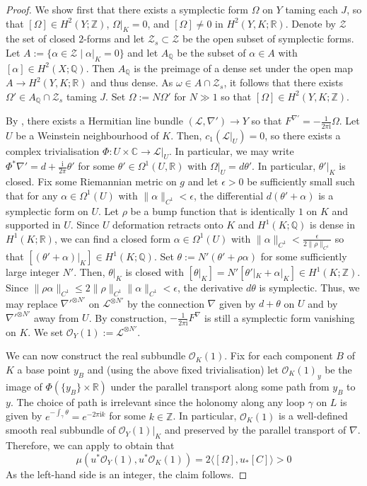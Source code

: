 \documentclass[11pt,psamsfonts, oneside, reqno]{amsart}
\newcommand{\sub}{\subset}%
\newcommand{\norm}[1]{\lVert#1\rVert}
\newcommand{\cl}{\colon}
\newcommand{\conn}{\nabla}
\newcommand{\lspan}[1]{\langle {#1}\rangle}
\newcommand{\bC}{\mathbb{C}}
\newcommand{\bQ}{\mathbb{Q}}
\newcommand{\bR}{\mathbb{R}}
\newcommand{\bZ}{\mathbb{Z}}
\newcommand{\cL}{\mathcal{L}}
\newcommand{\cO}{\mathcal{O}}
\newcommand{\cZ}{\mathcal{Z}}
\theoremstyle{definition}
\theoremstyle{remark}
\numberwithin{equation}{section}
\begin{document}
\begin{proof} We show first that there exists a symplectic form $\Omega$ on $Y$ taming each $J$, so that $[\Omega]\in H^2(Y;\bZ)$, $\Omega|_K = 0$, and $[\Omega]\neq 0$ in $H^2(Y,K;\bR)$. Denote by $\cZ$ the set of closed $2$-forms and let $\cZ_s \sub \cZ$ be the open subset of symplectic forms. Let $A := \{\alpha\in \cZ\mid \alpha|_K = 0\}$ and let $A_\bQ$ be the subset of $\alpha\in A$ with $[\alpha]\in H^2(X;\bQ)$. Then $A_\bQ$ is the preimage of a dense set under the open map $A \rightarrow H^2(Y,K;\bR)$ and thus dense. As $\omega\in A\cap \cZ_s$, it follows that there exists $\Omega'\in A_\bQ\cap \cZ_s$ taming $J$. Set $\Omega := N\Omega'$ for $N\gg 1$ so that $[\Omega]\in H^2(Y,K;\bZ)$.\par
	 By \cite[Lemma~3.2]{HS22}, there exists a Hermitian line bundle $(\cL,\conn')\to Y$ so that $F^{\conn'} = -\frac{1}{2\pi\text{i}}\Omega$. Let $U$ be a Weinstein neighbourhood of $K$. Then, $c_1(\cL|_U) = 0$, so there exists a complex trivialisation $\Phi \cl U\times\bC\to \cL|_U$. In particular, we may write $\Phi^*\conn'= d + \frac{\text{i}}{2\pi}\theta'$ for some $\theta'\in \Omega^1(U,\bR)$ with $\Omega|_U = d\theta'$. In particular, $\theta'|_K$ is closed. Fix some Riemannian metric on $g$ and let $\epsilon >0 $ be sufficiently small such that for any $\alpha \in \Omega^1(U)$ with $\norm{\alpha}_{C^1} < \epsilon$, the differential $d(\theta' +\alpha)$ is a symplectic form on $U$. Let $\rho$ be a bump function that is identically $1$ on $K$ and supported in $U$. Since $U$ deformation retracts onto $K$ and $H^1(K;\bQ)$ is dense in $H^1(K;\bR)$, we can find a closed form $\alpha\in \Omega^1(U)$ with $\norm{\alpha}_{C^1} < \frac{\epsilon}{2\norm{\rho}_{C^1}}$ so that $[(\theta'+\alpha)|_K] \in H^1(K;\bQ)$. Set $\theta := N'(\theta' +\rho\alpha)$ for some sufficiently large integer $N'$. Then, $\theta|_K$ is closed with $[\theta|_K] = N'[\theta'|_K+\alpha|_K] \in H^1(K;\bZ)$. Since $\norm{\rho\alpha}_{C^1} \leq 2\norm{\rho}_{C^1}\norm{\alpha}_{C^1} < \epsilon$, the derivative $d\theta$ is symplectic. Thus, we may replace ${\conn'}^{\otimes N'}$ on $\cL^{\otimes N'}$ by the connection $\conn$ given by $d+\theta$ on $U$ and by ${\conn'}^{\otimes N'}$ away from $U$. By construction, $-\frac{1}{2\pi\text{i}}F^\conn$ is still a symplectic form vanishing on $K$. We set $\cO_Y(1) := \cL^{\otimes N'}$.\par
	 We can now construct the real subbundle $\cO_K(1)$. Fix for each component $B$ of $K$ a base point $y_B$ and (using the above fixed trivialisation) let $\cO_K(1)_y$ be the image of $\Phi(\{y_B\}\times \bR)$ under the parallel transport along some path from $y_B$ to $y$. The choice of path is irrelevant since the holonomy along any loop $\gamma$ on $L$ is given by $e^{-\int_\gamma\theta} = e^{-2\pi\text{i}k}$ for some $k \in \bZ$. In particular, $\cO_K(1)$ is a well-defined smooth real subbundle of $\cO_Y(1)|_K$ and preserved by the parallel transport of $\conn$. Therefore, we can apply \cite[Theorem 3.1]{ChSh16} to obtain that 
	$$\mu(u^*\cO_Y(1),u^*\cO_K(1)) = 2\lspan{[\Omega],u_*[C]} > 0$$\noindent
	As the left-hand side is an integer, the claim follows.
\end{proof}
 
\end{document}
